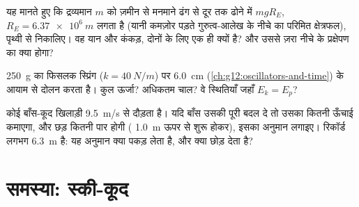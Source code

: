 \begin{exercise}[$\star\star\star$]\label{exo:g12:work-and-energy:13}
यह मानते हुए कि द्रव्यमान $m$ को ज़मीन से मनमाने ढंग से दूर तक ढोने में
$mgR_E$, $R_E = \qty{6.37e6}{m}$ लगता है (यानी कमज़ोर पड़ते गुरुत्व-आलेख के नीचे का परिमित
क्षेत्रफल), पृथ्वी से \emph{} निकालिए। वह यान और कंकड़, दोनों
के लिए एक ही क्यों है? और उससे ज़रा नीचे के प्रक्षेपण का क्या होगा?
\end{exercise}

\begin{exercise}[$\star\star\star$]\label{exo:g12:work-and-energy:14}
\qty{250}{g} का फिसलक स्प्रिंग ($k = \qty{40}{N/m}$) पर \qty{6.0}{cm} (\cref{ch:g12:oscillators-and-time}) के आयाम से
दोलन करता है। कुल ऊर्जा? अधिकतम चाल? वे स्थितियाँ जहाँ $E_k = E_p$?
\end{exercise}

\begin{exercise}[$\star\star\star$]\label{exo:g12:work-and-energy:15}
कोई बाँस-कूद खिलाड़ी \qty{9.5}{m/s} से दौड़ता है। यदि बाँस उसकी पूरी  बदल दे तो उसका  कितनी ऊँचाई कमाएगा, और छड़ कितनी पार
होगी ( \qty{1.0}{m} ऊपर से शुरू होकर), इसका अनुमान लगाइए। रिकॉर्ड
लगभग \qty{6.3}{m} है: यह अनुमान क्या पकड़ लेता है, और क्या छोड़ देता है?
\end{exercise}

\section{समस्या: स्की-कूद}

